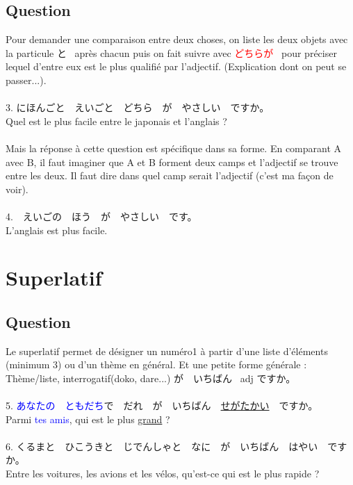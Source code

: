 \documentclass[11pt]{report}
\newenvironment{Japanese}{%
\CJKfamily{min}%
\CJKtilde  
\CJKnospace}{}
\begin{document}
\subsection{Question}

\begin{CJK}{UTF8}{}  
\begin{Japanese}
	Pour demander une comparaison entre deux choses, on liste les deux objets avec la particule と \, après chacun puis on fait suivre avec \textcolor{red}{どちらが} \, pour préciser lequel d'entre eux est le plus qualifi\'e par l'adjectif. (Explication dont on peut se passer...). \\ \\
	3. にほんごと　えいごと　どちら　が　やさしい　ですか。 \\
	Quel est le plus facile entre le japonais et l'anglais ? \\ 
	\\
	Mais la réponse \`a cette question est spécifique dans sa forme. En comparant A avec B, il faut imaginer que A et B forment deux camps et l'adjectif se trouve entre les deux. Il faut dire dans quel camp serait l'adjectif (c'est ma façon de voir). \\
	\\
	4.　えいごの　ほう　が　やさしい　です。 \\
	L'anglais est plus facile.
\end{Japanese}  
\end{CJK}

\section{Superlatif}

\subsection{Question}

\begin{CJK}{UTF8}{}  
\begin{Japanese}
	Le superlatif permet de désigner un numéro1 \`a partir d'une liste d'éléments (minimum 3) ou d'un thème en général. Et une petite forme générale : \\
	Thème/liste, interrogatif(doko, dare...) が　いちばん \, adj ですか。 \\ \\
	5. \textcolor{blue}{あなたの　ともだち}で　だれ　が　いちばん　\underline{せがたかい}　ですか。 \\
	Parmi \textcolor{blue}{tes amis}, qui est le plus \underline{grand} ? \\ \\
	6. くるまと　ひこうきと　じでんしゃと　なに　が　いちばん　はやい　ですか。 \\
	Entre les voitures, les avions et les vélos, qu'est-ce qui est le plus rapide ?
	
\end{Japanese}  
\end{CJK}
\end{document}
